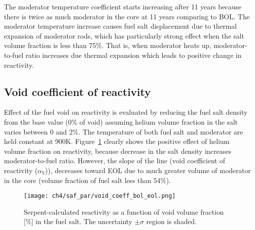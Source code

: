 The moderator temperature coefficient starts increasing after 11 years because 
there is twice as much 
moderator in the core at 11 years comparing to \gls{BOL}. The moderator 
temperature increase causes fuel salt displacement due to thermal expansion of 
moderator rods, which has particularly strong effect when the salt volume 
fraction is less than 75\%. That is, when moderator heats up, 
moderator-to-fuel ratio increases 
due thermal expansion which leads to positive change in reactivity. %

\subsection{Void coefficient of reactivity}
Effect of the fuel void on reactivity is evaluated by reducing the fuel salt 
density from the base value (0\% of void) assuming helium volume fraction in 
the salt varies between 0 and 2\%. The temperature of both fuel salt and 
moderator are held constant at 900K. Figure~\ref{fig:void-bol-eol} clearly 
shows the positive effect of helium volume fraction on reactivity, because 
decrease in the salt density increases moderator-to-fuel ratio. However, the 
slope of the line (void coefficient of reactivity ($\alpha_{V}$)), decreases 
toward \gls{EOL} due to much greater volume of moderator in the core (volume 
fraction of fuel salt less than 54\%).
\begin{figure}[htp!] %
	\centering
	\texttt{[image: ch4/saf\_par/void\_coeff\_bol\_eol.png]}
	\vspace{-4mm}
	\caption{Serpent-calculated reactivity as a function of void volume 
		fraction [\%] in the fuel salt. The uncertainty $\pm\sigma$ region is 
		shaded.}
	\label{fig:void-bol-eol}
\end{figure}

